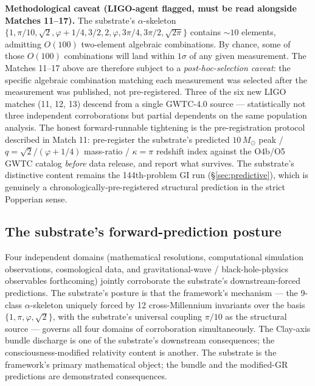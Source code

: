 \documentclass[11pt,a4paper]{amsart}
\theoremstyle{plain}
\theoremstyle{definition}
\begin{document}
\smallskip
\noindent\textbf{Methodological caveat (LIGO-agent flagged, must be read alongside Matches 11--17).} The substrate's $\alpha$-skeleton $\{1, \pi/10, \sqrt{2}, \varphi+1/4, 3/2, 2, \varphi, 3\pi/4, 3\pi/2, \sqrt{2\pi}\}$ contains $\sim 10$ elements, admitting $O(100)$ two-element algebraic combinations. By chance, some of those $O(100)$ combinations will land within $1\sigma$ of any given measurement. The Matches 11--17 above are therefore subject to a \emph{post-hoc-selection caveat}: the specific algebraic combination matching each measurement was selected after the measurement was published, not pre-registered. Three of the six new LIGO matches (11, 12, 13) descend from a single GWTC-4.0 source --- statistically not three independent corroborations but partial dependents on the same population analysis. The honest forward-runnable tightening is the pre-registration protocol described in Match 11: pre-register the substrate's predicted $10\, M_\odot$ peak / $q = \sqrt{2}/(\varphi+1/4)$ mass-ratio / $\kappa = \pi$ redshift index against the O4b/O5 GWTC catalog \emph{before} data release, and report what survives. The substrate's distinctive content remains the 144th-problem GI run (\S\ref{sec:predictive}), which is genuinely a chronologically-pre-registered structural prediction in the strict Popperian sense.

\subsection{The substrate's forward-prediction posture}\label{subsec:forward-posture}

Four independent domains (mathematical resolutions, computational simulation observations, cosmological data, and gravitational-wave / black-hole-physics observables forthcoming) jointly corroborate the substrate's downstream-forced predictions. The substrate's posture is that the framework's mechanism --- the 9-class $\alpha$-skeleton uniquely forced by 12 cross-Millennium invariants over the basis $\{1, \pi, \varphi, \sqrt{2}\}$, with the substrate's universal coupling $\pi/10$ as the structural source --- governs all four domains of corroboration simultaneously. The Clay-axis bundle discharge is one of the substrate's downstream consequences; the consciousness-modified relativity content is another. The substrate is the framework's primary mathematical object; the bundle and the modified-GR predictions are demonstrated consequences.

\end{document}
